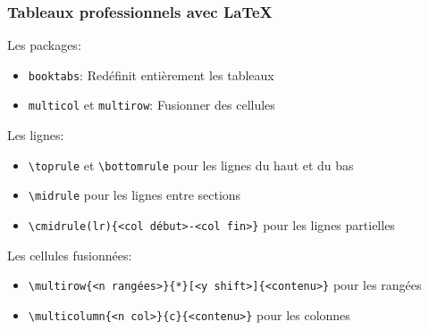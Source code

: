 \documentclass[aspectratio=169]{beamer}
\begin{document}
\begin{frame}[fragile]\frametitle{Tableaux professionnels avec LaTeX}

\vspace{-3mm}

Les packages:
\vspace{-\parskip}
\begin{itemize}
	\item \texttt{booktabs}: Redéfinit entièrement les tableaux
	\item \texttt{multicol} et \texttt{multirow}: Fusionner des cellules
\end{itemize}

Les lignes:
\vspace{-\parskip}
\begin{itemize}
	\item \verb!\toprule! et \verb!\bottomrule! pour les lignes du haut et du bas
	\item \verb!\midrule! pour les lignes entre sections
	\item \verb!\cmidrule(lr){<col début>-<col fin>}! pour les lignes partielles
\end{itemize}

Les cellules fusionnées:
\vspace{-\parskip}
\begin{itemize}
	\item \verb!\multirow{<n rangées>}{*}[<y shift>]{<contenu>}! pour les rangées
	\item \verb!\multicolumn{<n col>}{c}{<contenu>}! pour les colonnes
\end{itemize}

\end{frame}
\end{document}
